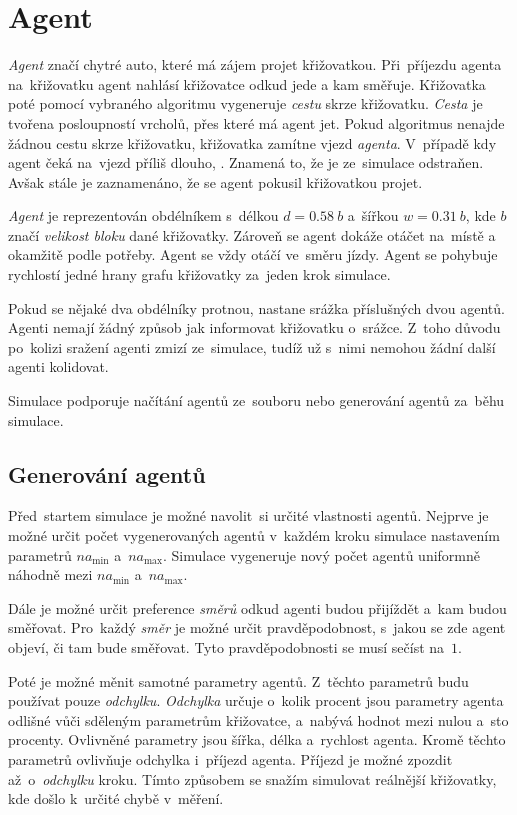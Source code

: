 \section{Agent}\label{sec:agent}

\emph{Agent} značí chytré auto, které má zájem projet křižovatkou.
Při~příjezdu agenta na~křižovatku agent nahlásí křižovatce odkud jede a kam směřuje.
Křižovatka poté pomocí vybraného algoritmu vygeneruje \emph{cestu} skrze křižovatku.
\emph{Cesta} je tvořena posloupností vrcholů, přes které má agent jet.
Pokud algoritmus nenajde žádnou cestu skrze křižovatku, křižovatka zamítne vjezd \emph{agenta}.
V~případě kdy agent čeká na~vjezd příliš dlouho, .
Znamená to, že je ze~simulace odstraňen.
Avšak stále je zaznamenáno, že se agent pokusil křižovatkou projet.

\emph{Agent} je reprezentován obdélníkem s~délkou $d=0.58~b$ a~šířkou $w=0.31~b$,
kde $b$ značí \emph{velikost bloku} dané křižovatky.
Zároveň se agent dokáže otáčet na~místě a okamžitě podle potřeby.
Agent se vždy otáčí ve~směru jízdy.
Agent se pohybuje rychlostí jedné hrany grafu křižovatky za~jeden krok simulace.

Pokud se nějaké dva obdélníky protnou, nastane srážka příslušných dvou agentů.
Agenti nemají žádný způsob jak informovat křižovatku o~srážce.
Z~toho důvodu po~kolizi sražení agenti zmizí ze~simulace, tudíž už s~nimi nemohou žádní další agenti kolidovat.

Simulace podporuje načítání agentů ze~souboru nebo generování agentů za~běhu simulace.

\subsection{Generování agentů}\label{subsec:generovani-agentu}

Před~startem simulace je možné navolit~si určité vlastnosti agentů.
Nejprve je možné určit počet vygenerovaných agentů v~každém kroku simulace nastavením parametrů $na_{\min}$ a~$na_{\max}$.
Simulace vygeneruje nový počet agentů uniformně náhodně mezi $na_{\min}$ a~$na_{\max}$.

Dále je možné určit preference \emph{směrů} odkud agenti budou přijíždět a~kam budou směřovat.
Pro~každý \emph{směr} je možné určit pravděpodobnost, s~jakou se zde agent objeví, či tam bude směřovat.
Tyto pravděpodobnosti se musí sečíst na~$1$.

Poté je možné měnit samotné parametry agentů.
Z~těchto parametrů budu používat pouze \emph{odchylku}.
\emph{Odchylka} určuje o~kolik procent jsou parametry agenta odlišné vůči sděleným parametrům křižovatce,
a~nabývá hodnot mezi nulou a~sto procenty.
Ovlivněné parametry jsou šířka, délka a~rychlost agenta.
Kromě těchto parametrů ovlivňuje odchylka i~příjezd agenta.
Příjezd je možné zpozdit až~o~\emph{odchylku} kroku.
Tímto způsobem se snažím simulovat reálnější křižovatky, kde došlo k~určité chybě v~měření.
